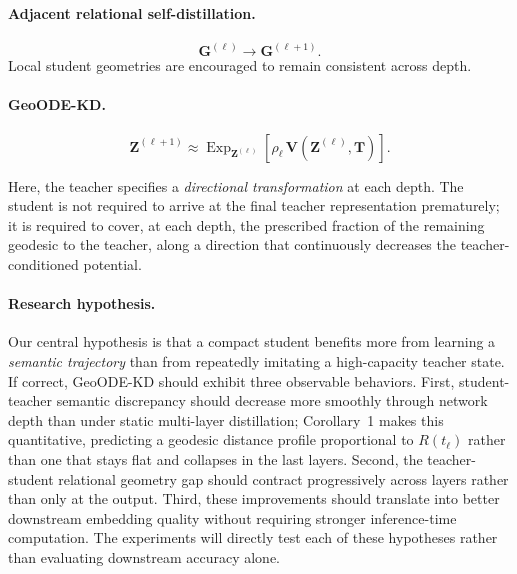 \documentclass[11pt]{article}
\begin{document}
\paragraph{Adjacent relational self-distillation.}
\begin{equation}
    \mathbf{G}^{(\ell)}
    \rightarrow
    \mathbf{G}^{(\ell+1)}.
\end{equation}
Local student geometries are encouraged to remain consistent across depth.

\paragraph{GeoODE-KD.}
\begin{equation}
    \boxed{
    \mathbf{Z}^{(\ell+1)}
    \approx
    \operatorname{Exp}_{\mathbf{Z}^{(\ell)}}
    \left[
        \rho_\ell\,
        \mathbf{V}(
            \mathbf{Z}^{(\ell)},
            \mathbf{T}
        )
    \right]
    }.
\end{equation}

Here, the teacher specifies a \emph{directional transformation} at each
depth. The student is not required to arrive at the final teacher
representation prematurely; it is required to cover, at each depth, the
prescribed fraction of the remaining geodesic to the teacher, along a
direction that continuously decreases the teacher-conditioned potential.



\paragraph{Research hypothesis.}

Our central hypothesis is that a compact student benefits more from
learning a \emph{semantic trajectory} than from repeatedly imitating a
high-capacity teacher state. If correct, GeoODE-KD should exhibit three
observable behaviors. First, student-teacher semantic discrepancy should
decrease more smoothly through network depth than under static multi-layer
distillation; Corollary~1 makes this quantitative, predicting a geodesic
distance profile proportional to $R(t_\ell)$ rather than one that stays
flat and collapses in the last layers. Second, the teacher-student relational geometry gap should
contract progressively across layers rather than only at the output.
Third, these improvements should translate into better downstream
embedding quality without requiring stronger inference-time computation.
The experiments will directly test each of these hypotheses rather than
evaluating downstream accuracy alone.



\end{document}
